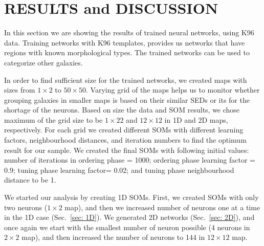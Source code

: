 \section{RESULTS and DISCUSSION}
\label{sec: result}

    In this section we are showing the results of trained neural networks, using K96 data.
    Training networks with K96 templates, provides us networks that have regions with known morphological types. The trained networks can be used to categorize other galaxies.
    
    In order to find sufficient size for the trained networks, we created maps with sizes from $1\times2$ to $50\times50$.
    Varying grid of the maps helps us to monitor whether grouping galaxies in smaller maps is based on their similar SEDs or its for the shortage of the neurons.
    Based on size the data and SOM results, we chose maximum of the grid size to be $1\times22$ and $12\times12$ in 1D and 2D maps, respectively. 
    For each grid we created different SOMs with different learning factors, neighbourhood distances, and iteration numbers to find the optimum result for our sample.
    We created the final SOMs with following initial values: number of iterations in ordering phase = 1000; ordering phase learning factor = 0.9; tuning phase learning factor= 0.02; and tuning phase neighbourhood distance to be 1. %
   
    We started our analysis by creating 1D SOMs. 
    First, we created SOMs with only two neurons ($1\times2$ map), and then we increased number of neurons one at a time in the 1D case (Sec.~\ref{sec: 1D}).
    We generated 2D networks (Sec.~\ref{sec: 2D}), and once again we start with the smallest number of neuron possible (4 neurons in $2\times2$ map), and then increased the number of neurons to 144 in $12\times12$ map.
    
